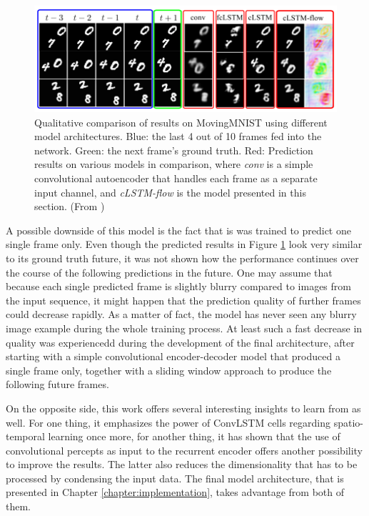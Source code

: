 \begin{figure}[htb]
	\centering
	\includegraphics[width=1.0\linewidth]{figures/related/spat_temp_results.png} 
	\caption[Qualitative Moving MNIST Results of LSTM Models]{Qualitative comparison of results on MovingMNIST using different model architectures. Blue: the last 4 out of 10 frames fed into the network. Green: the next frame's ground truth. Red: Prediction results on various models in comparison, where \textit{conv} is a simple convolutional autoencoder that handles each frame as a separate input channel, and \textit{cLSTM-flow} is the model presented in this section. (From \parencite{spat_temp_video_autoenc})} \label{fig:spatiotemp_results}
\end{figure}

A possible downside of this model is the fact that is was trained to predict one single frame only. Even though the predicted results in Figure \ref{fig:spatiotemp_results} look very similar to its ground truth future, it was not shown how the performance continues over the course of the following predictions in the future. One may assume that because each single predicted frame is slightly blurry compared to images from the input sequence, it might happen that the prediction quality of further frames could decrease rapidly. As a matter of fact, the model has never seen any blurry image example during the whole training process. At least such a fast decrease in quality was experiencedd during the development of the final architecture, after starting with a simple convolutional encoder-decoder model that produced a single frame only, together with a sliding window approach to produce the following future frames.

On the opposite side, this work offers several interesting insights to learn from as well. For one thing, it emphasizes the power of ConvLSTM cells regarding spatio-temporal learning once more, for another thing, it has shown that the use of convolutional percepts as input to the recurrent encoder offers another possibility to improve the results. The latter also reduces the dimensionality that has to be processed by condensing the input data. The final model architecture, that is presented in Chapter \ref{chapter:implementation}, takes advantage from both of them.


